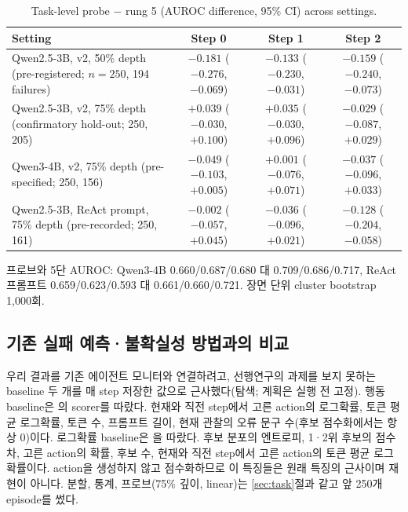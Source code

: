 \documentclass[11pt]{article}
\begin{document}
\begin{table}[t]
\centering\small
\caption{Task-level probe $-$ rung 5 (AUROC difference, 95\% CI) across settings.}\label{tab:settings}
\begin{tabularx}{\linewidth}{@{}Lccc@{}}
\toprule
Setting & Step 0 & Step 1 & Step 2 \\
\midrule
Qwen2.5-3B, v2, 50\% depth (pre-registered; $n = 250$, 194 failures) & $-0.181$ ($-0.276$, $-0.069$) & $-0.133$ ($-0.230$, $-0.031$) & $-0.159$ ($-0.240$, $-0.073$) \\
Qwen2.5-3B, v2, 75\% depth (confirmatory hold-out; 250, 205) & $+0.039$ ($-0.030$, $+0.100$) & $+0.035$ ($-0.030$, $+0.096$) & $-0.029$ ($-0.087$, $+0.029$) \\
Qwen3-4B, v2, 75\% depth (pre-specified; 250, 156) & $-0.049$ ($-0.103$, $+0.005$) & $+0.001$ ($-0.076$, $+0.071$) & $-0.037$ ($-0.096$, $+0.033$) \\
Qwen2.5-3B, ReAct prompt, 75\% depth (pre-recorded; 250, 161) & $-0.002$ ($-0.057$, $+0.045$) & $-0.036$ ($-0.096$, $+0.021$) & $-0.128$ ($-0.204$, $-0.058$) \\
\bottomrule
\end{tabularx}
\par\smallskip\raggedright\footnotesize
프로브와 5단 AUROC: Qwen3-4B 0.660/0.687/0.680 대 0.709/0.686/0.717, ReAct 프롬프트 0.659/0.623/0.593 대 0.661/0.660/0.721. 장면 단위 cluster bootstrap 1,000회.
\end{table}

\subsection{기존 실패 예측·불확실성 방법과의 비교}\label{sec:prior}
우리 결과를 기존 에이전트 모니터와 연결하려고, 선행연구의 과제를 보지 못하는 baseline 두 개를 매 step 저장한 값으로 근사했다(탐색; 계획은 실행 전 고정).
행동 baseline은 \cite{ruan2026doomed}의 scorer를 따랐다. 현재와 직전 step에서 고른 action의 로그확률, 토큰 평균 로그확률, 토큰 수, 프롬프트 길이, 현재 관찰의 오류 문구 수(후보 점수화에서는 항상 0)이다.
로그확률 baseline은 \cite{pham2026agentstop}을 따랐다. 후보 분포의 엔트로피, 1·2위 후보의 점수 차, 고른 action의 확률, 후보 수, 현재와 직전 step에서 고른 action의 토큰 평균 로그확률이다.
action을 생성하지 않고 점수화하므로 이 특징들은 원래 특징의 근사이며 재현이 아니다. 분할, 통계, 프로브(75\% 깊이, linear)는 \ref{sec:task}절과 같고 앞 250개 episode를 썼다.
\end{document}
